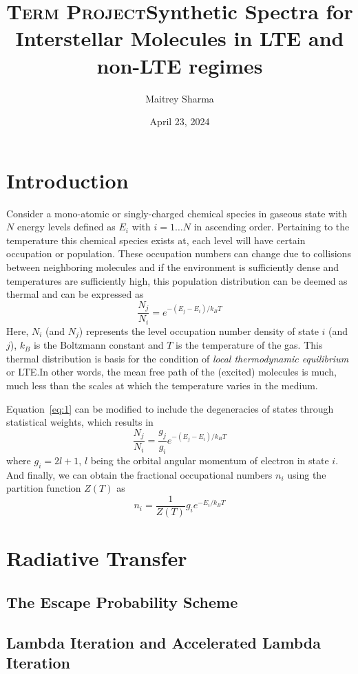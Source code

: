 \documentclass{article}
\title{\textsc{Term Project}}
\title{\textbf{Synthetic Spectra for Interstellar
        Molecules in LTE and non-LTE regimes}}
\author{Maitrey Sharma}
\date{April 23, 2024}
\begin{document}
\maketitle
\begin{abstract}

\end{abstract}
\section{Introduction}
Consider a mono-atomic or singly-charged chemical species in gaseous state with
\(N\) energy levels defined as \(E_i\) with \(i = 1 \ldots N\) in ascending
order. Pertaining to the temperature this chemical species exists at, each
level will have certain occupation or population. These occupation numbers can
change due to collisions between neighboring molecules and if the environment
is sufficiently dense and temperatures are sufficiently high, this population
distribution can be deemed as thermal and can be expressed as
\begin{equation}\label{eq:1}
    \dfrac{N_j}{N_i} = {e}^{-(E_j - E_i)/k_B T}
\end{equation}
Here, \(N_i\) (and \(N_j\)) represents the level occupation number density of state
\(i\) (and \(j\)), \(k_B\) is the Boltzmann constant and \(T\) is the temperature of the
gas. This thermal distribution is basis for the condition of \textit{local thermodynamic
    equilibrium} or LTE.\@ In other words, the mean free path of the (excited) molecules
is much, much less than the scales at which the temperature varies in the medium.

Equation~\ref{eq:1} can be modified to include the degeneracies of states through
statistical weights, which results in
\begin{equation}
    \dfrac{N_j}{N_i} = \dfrac{g_j}{g_i} {e}^{-(E_j - E_i)/k_B T}
\end{equation}
where \(g_i = 2l+ 1\), \(l\) being the orbital angular momentum of electron in state
\(i\). And finally, we can obtain the fractional occupational numbers \(n_i\) using the
partition function \(Z(T)\) as
\begin{equation}
    n_i = \dfrac{1}{Z(T)} g_i {e}^{-E_i / k_B T}
\end{equation} 

\section{Radiative Transfer}

\subsection{The Escape Probability Scheme}
\subsection{Lambda Iteration and Accelerated Lambda Iteration}
\end{document}
